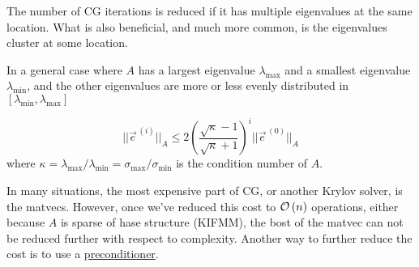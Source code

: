 The number of CG iterations is reduced if it has multiple eigenvalues at the same location. What is also beneficial, and much more common, is the eigenvalues cluster at some location.

\begin{center}

\end{center}

In a general case where $A$ has a largest eigenvalue $\lambda_{\max}$ and a smallest eigenvalue $\lambda_{\min}$, and the other eigenvalues are more or less evenly distributed in $[\lambda_{\min}, \lambda_{\max}]$

\begin{equation*}
    \lvert\lvert \vec{e}^{\,(i)} \rvert\rvert_{A}
    \leq
    2
    \left(
    \frac{\sqrt{\kappa} - 1}{\sqrt{\kappa} + 1}
    \right)^i
    \lvert\lvert \vec{e}^{\,(0)} \rvert\rvert_{A}
\end{equation*}
where $\kappa = \lambda_{\max}/\lambda_{\min} = \sigma_{\max}/\sigma_{\min}$ is the condition number of $A$.

In many situations, the most expensive part of CG, or another Krylov solver, is the matvecs. However, once we've reduced this cost to $\mathcal{O}\left(n\right)$ operations, either because $A$ is sparse of hase structure (KIFMM), the bost of the matvec can not be reduced further with respect to complexity. Another way to further reduce the cost is to use a \underline{preconditioner}.


